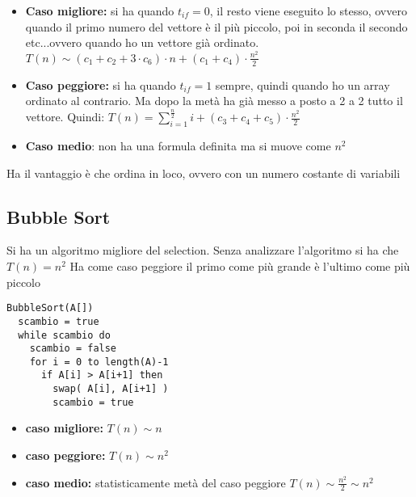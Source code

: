 \documentclass[a4paper,12pt,oneside,tikz]{book}
\begin{document}
\begin{itemize}
	\item \textbf{Caso migliore:} si ha quando $t_{if}=0$, il resto viene eseguito lo stesso, ovvero quando il primo numero del vettore è il più piccolo, poi in seconda il secondo etc...ovvero quando ho un vettore già ordinato. $T(n)\sim (c_1+c_2+3\cdot c_6)\cdot n+(c_1+c_4)\cdot\frac{n^2}{2}$
	\item \textbf{Caso peggiore:} si ha quando $t_{if}=1$ sempre, quindi quando ho un array ordinato al contrario. Ma dopo la metà ha già messo a posto a 2 a 2 tutto il vettore. Quindi: $T(n)=\sum_{i=1}^{\frac{n}{2}}i+(c_3+c_4+c_5)\cdot\frac{n^2}{2}$
	\item \textbf{Caso medio}: non ha una formula definita ma si muove come $n^2$
\end{itemize}
Ha il vantaggio è che ordina in loco, ovvero con un numero costante di variabili
\subsection{Bubble Sort}
Si ha un algoritmo migliore del selection. Senza analizzare l'algoritmo si ha che $T(n)=n^2$
Ha come caso peggiore il primo come più grande è l'ultimo come più piccolo
\begin{verbatim}
BubbleSort(A[])
  scambio = true
  while scambio do
    scambio = false
    for i = 0 to length(A)-1  
      if A[i] > A[i+1] then
        swap( A[i], A[i+1] )
        scambio = true
\end{verbatim}
\begin{itemize}
	\item \textbf{caso migliore:} $T(n)\sim n$
	\item \textbf{caso peggiore:} $T(n)\sim n^2$
	\item \textbf{caso medio:} statisticamente metà del caso peggiore $T(n)\sim\frac{n^2}{2}\sim n^2$
\end{itemize}
\newpage
\end{document}
